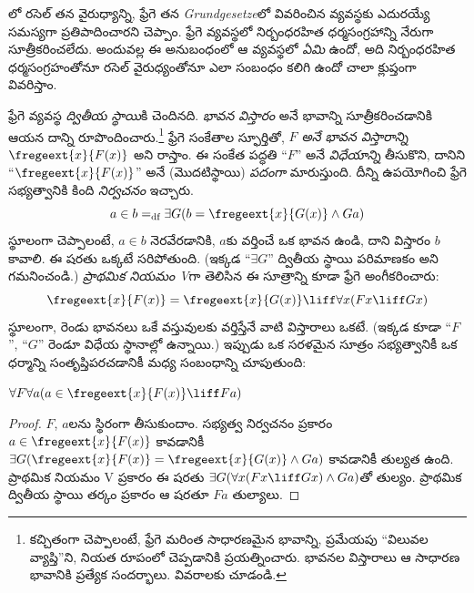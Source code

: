 \documentclass[../../../include/open-logic-section]{subfiles}
\begin{document}


లో రసెల్ తన
వైరుధ్యాన్ని, ఫ్రేగె తన
\emph{Grundgesetze}లో వివరించిన
వ్యవస్థకు ఎదురయ్యే సమస్యగా ప్రతిపాదించారని
చెప్పాం. ఫ్రేగె వ్యవస్థలో
నిర్బంధరహిత ధర్మసంగ్రహాన్ని నేరుగా సూత్రీకరించలేదు.
అందువల్ల ఈ అనుబంధంలో
ఆ వ్యవస్థలో \emph{ఏమి}
ఉందో, అది నిర్బంధరహిత
ధర్మసంగ్రహంతోనూ రసెల్
వైరుధ్యంతోనూ ఎలా సంబంధం
కలిగి ఉందో చాలా క్లుప్తంగా
వివరిస్తాం.

ఫ్రేగె వ్యవస్థ \emph{ద్వితీయ స్థాయి}కి చెందినది.
\emph{భావన విస్తారం} అనే భావాన్ని సూత్రీకరించడానికి
ఆయన దాన్ని రూపొందించారు.\footnote{కచ్చితంగా
చెప్పాలంటే, ఫ్రేగె మరింత సాధారణమైన
భావాన్ని, ప్రమేయపు ``విలువల
వ్యాప్తి''ని, నియత రూపంలో చెప్పడానికి
ప్రయత్నించారు. భావనల విస్తారాలు
ఆ సాధారణ భావానికి ప్రత్యేక
సందర్భాలు. వివరాలకు
\citet[pp.\ 8--9]{Heck2012} చూడండి.}
ఫ్రేగె సంకేతాల స్ఫూర్తితో,
\emph{$F$ అనే భావన విస్తారాన్ని}
$\fregeext{x}{F(x)}$ అని రాస్తాం.
ఈ సంకేత పద్ధతి ``$F$'' అనే \emph{విధేయాన్ని} తీసుకొని,
దానిని ``$\fregeext{x}{F(x)}$''
అనే (మొదటిస్థాయి) \emph{పదంగా}
మారుస్తుంది. దీన్ని ఉపయోగించి
ఫ్రేగె సభ్యత్వానికి కింది
\emph{నిర్వచనం} ఇచ్చారు.
\[
	a \in b =_\text{df} \exists G(b = \fregeext{x}{G(x)} \land Ga)
\]
స్థూలంగా చెప్పాలంటే, $a \in b$ నెరవేరడానికి,
$a$కు వర్తించే ఒక భావన ఉండి, దాని విస్తారం
$b$ కావాలి. ఈ షరతు ఒక్కటే సరిపోతుంది. (ఇక్కడ
``$\exists G$'' ద్వితీయ స్థాయి పరిమాణకం
అని గమనించండి.) \emph{ప్రాథమిక
నియమం V}గా తెలిసిన ఈ
సూత్రాన్ని కూడా ఫ్రేగె
అంగీకరించారు:
$$\fregeext{x}{F(x)} = \fregeext{x}{G(x)} \liff \forall x (Fx \liff Gx)$$
స్థూలంగా, రెండు భావనలు
ఒకే వస్తువులకు వర్తిస్తేనే
వాటి విస్తారాలు ఒకటే.
(ఇక్కడ కూడా ``$F$'',
``$G$'' రెండూ విధేయ
స్థానాల్లో ఉన్నాయి.) ఇప్పుడు
ఒక సరళమైన సూత్రం సభ్యత్వానికీ
ఒక ధర్మాన్ని సంతృప్తిపరచడానికీ మధ్య సంబంధాన్ని చూపుతుంది:

\begin{lem}
$\forall F \forall a(a \in \fregeext{x}{F(x)} \liff Fa)$
\end{lem}

\begin{proof} 
$F$, $a$లను స్థిరంగా తీసుకుందాం.
సభ్యత్వ నిర్వచనం ప్రకారం
$a \in \fregeext{x}{F(x)}$ కావడానికీ
$\exists G(\fregeext{x}{F(x)}
= \fregeext{x}{G(x)} \land Ga)$ కావడానికీ తుల్యత ఉంది.
ప్రాథమిక నియమం V ప్రకారం ఈ షరతు
$\exists G(\forall x(Fx \liff Gx) \land Ga)$తో తుల్యం.
ప్రాథమిక ద్వితీయ స్థాయి తర్కం ప్రకారం ఆ షరతూ
$Fa$ తుల్యాలు.
\end{proof}
\end{document}
